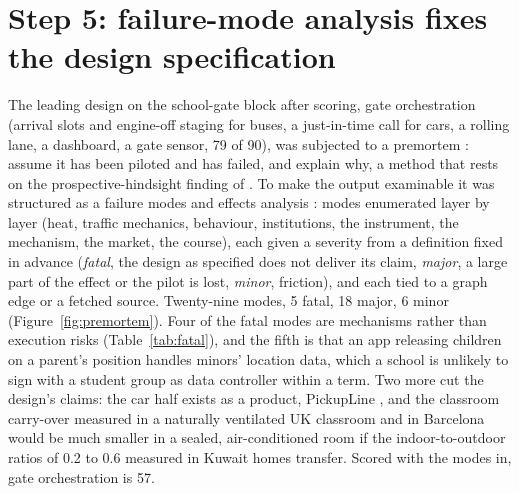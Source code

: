\documentclass[10pt,a4paper]{article}
\begin{document}
\section{Step 5: failure-mode analysis fixes the design specification}\label{sec:premortem}
The leading design on the school-gate block after scoring, gate orchestration (arrival slots and engine-off staging for buses, a just-in-time call for cars, a rolling lane, a dashboard, a gate sensor, 79 of 90), was subjected to a premortem \citep{Klein2007}: assume it has been piloted and has failed, and explain why, a method that rests on the prospective-hindsight finding of \citet{Mitchell1989}. To make the output examinable it was structured as a failure modes and effects analysis \citep{IEC60812}: modes enumerated layer by layer (heat, traffic mechanics, behaviour, institutions, the instrument, the mechanism, the market, the course), each given a severity from a definition fixed in advance (\emph{fatal}, the design as specified does not deliver its claim, \emph{major}, a large part of the effect or the pilot is lost, \emph{minor}, friction), and each tied to a graph edge or a fetched source. Twenty-nine modes, 5 fatal, 18 major, 6 minor (Figure~\ref{fig:premortem}). Four of the fatal modes are mechanisms rather than execution risks (Table~\ref{tab:fatal}), and the fifth is that an app releasing children on a parent's position handles minors' location data, which a school is unlikely to sign with a student group as data controller within a term. Two more cut the design's claims: the car half exists as a product, PickupLine \citep{iSchoolRide}, and the classroom carry-over measured in a naturally ventilated UK classroom \citep{Kumar2020} and in Barcelona \citep{Rivas2014} would be much smaller in a sealed, air-conditioned room if the indoor-to-outdoor ratios of 0.2 to 0.6 measured in Kuwait homes \citep{Yuan2020} transfer. Scored with the modes in, gate orchestration is 57.
\end{document}

